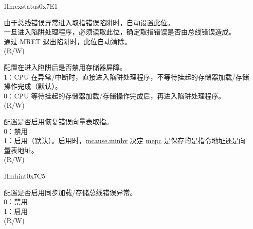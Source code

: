 \begin{register}{H}{mexstatus}{0x7E1}
\begin{regdesc}\begin{reglist}
\item [接上页……]
\label{fielddesc:MEXSTATUS_FETCH_ERR}\item [FETCH\_ERR] 由于总线错误异常进入取指错误陷阱时，自动设置此位。\\
一旦进入陷阱处理程序，必须读取此位，确定取指错误是否由总线错误造成。\\
通过 MRET 退出陷阱时，此位自动清除。\\
(R/W)
\label{fielddesc:MEXSTATUS_NMFT}\item [NMFT] 配置在进入陷阱后是否禁用存储器屏障。\\
1：CPU 在异常/中断时，直接进入陷阱处理程序，不等待挂起的存储器加载/存储操作完成（默认）。 \\
0：CPU 等待挂起的存储器加载/存储操作完成后，再进入陷阱处理程序。\\
(R/W)
\label{fielddesc:MEXSTATUS_CLIC_INHV}\item [CLIC\_INHV] 配置是否启用恢复错误向量表取指。\\
0：禁用\\
1：启用（默认）。启用时，\hyperref[fielddesc:MCAUSE_MINHV]{mcause.minhv} 决定 \hyperref[regdesc:MEPC]{mepc} 是保存的是指令地址还是向量表地址。\\
(R/W)
\end{reglist}\end{regdesc}
\end{register}

\begin{register}{H}{mhint}{0x7C5}\label{regdesc:MHINT}%
%
%
%
\regnewline%
\begin{regdesc}\begin{reglist}
\label{fielddesc:MHINT_SBE}\item [SBE] 配置是否启用同步加载/存储总线错误异常。\\
0：禁用\\
1：启用\\
(R/W)
\end{reglist}\end{regdesc}
\end{register}

